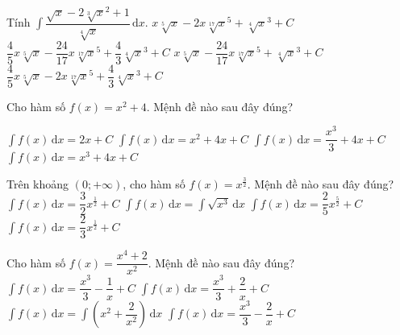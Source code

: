 \begin{ex}%
	Tính $\displaystyle\int{\dfrac{\sqrt{x}-2\sqrt[3]x^2+1}{\sqrt[4]x}\mathrm{\,d}x}$.
	\choice
	{$x\sqrt[5]x-2x\sqrt[17]x^5+\sqrt[4]x^3+C$}
	{\True $\dfrac{4}{5}x\sqrt[5]x-\dfrac{24}{17}x\sqrt[17]x^5+\dfrac{4}{3}\sqrt[4]x^3+C$}
	{$x\sqrt[5]x-\dfrac{24}{17}x\sqrt[17]x^5+\sqrt[4]x^3+C$}
	{$\dfrac{4}{5}x\sqrt[5]x-2x\sqrt[17]x^5+\dfrac{4}{3}\sqrt[4]x^3+C$}
\end{ex}

\begin{ex}%
	Cho hàm số $f(x)=x^2+4$. Mệnh đề nào sau đây đúng?
	
	\choice
	{$\displaystyle{\displaystyle\int f(x)\mathrm{\,d}x=2 x+C}$}
	{$\displaystyle{\displaystyle\int f(x)\mathrm{\,d}x=x^2+4 x+C}$}
	{\True $\displaystyle{\displaystyle\int f(x)\mathrm{\,d}x=\dfrac{x^3}{3}+4 x+C}$}
	{$\displaystyle{\displaystyle\int f(x)\mathrm{\,d}x=x^3+4 x+C}$}
\end{ex}
\begin{ex}%
	Trên khoảng $(0;+\infty)$, cho hàm số $f(x)=x^{\frac{3}{2}}$. Mệnh đề nào sau đây đúng?
	\choice
	{$\displaystyle\int{f(x)}\mathrm{\,d}x=\dfrac{3}{2}x^{\frac{1}{2}}+C$}
	{$\displaystyle\int{f(x)}\mathrm{\,d}x=\displaystyle\int{\sqrt{x^3}}\mathrm{\,d}x$}
	{\True $\displaystyle\int{f(x)}\mathrm{\,d}x=\dfrac{2}{5}x^{\frac{5}{2}}+C$}
	{$\displaystyle\int{f(x)}\mathrm{\,d}x=\dfrac{2}{3}x^{\frac{1}{2}}+C$}
\end{ex}

\begin{ex}%
	Cho hàm số $f(x)=\dfrac{x^4+2}{x^2}$. Mệnh đề nào sau đây đúng?
	\choice
	{$\displaystyle\int{f(x)\mathrm{\,d}x=}\dfrac{x^3}{3}-\dfrac{1}{x}+C$}
	{$\displaystyle\int{f(x)\mathrm{\,d}x=}\dfrac{x^3}{3}+\dfrac{2}{x}+C$}
	{$\displaystyle\int{f(x)\mathrm{\,d}x=}\displaystyle\int{\left(x^2+\dfrac{2}{x^2}\right)}\mathrm{\,d}x$}
	{\True $\displaystyle\int{f(x)\mathrm{\,d}x=}\dfrac{x^3}{3}-\dfrac{2}{x}+C$}
\end{ex}

